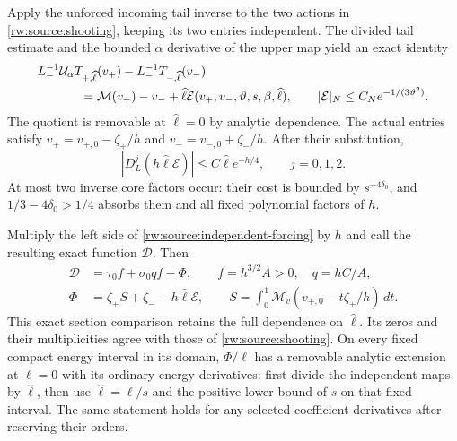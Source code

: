 Apply the unforced incoming tail inverse to the two actions in
\eqref{rw:source:shooting}, keeping its two entries independent.
The divided tail estimate and the bounded $\alpha$ derivative of the
upper map yield an exact identity
\begin{equation}\label{rw:source:independent-forcing}
\begin{split}
 &L_-^{-1}\mathcal U_\alpha T_{+,\widehat\ell}(v_+)
                   -L_-^{-1}T_{-,\widehat\ell}(v_-)\\
 &\hspace{12mm}=\mathcal M(v_+)-v_-
       +\widehat\ell\mathcal E(v_+,v_-,\vartheta,s,\beta,\widehat\ell),
 \qquad |\mathcal E|_N\le C_Ne^{-1/(3\vartheta^2)}.
\end{split}
\end{equation}
The quotient is removable at $\widehat\ell=0$ by analytic dependence.
The actual entries satisfy
$v_+=v_{+,0}-\zeta_+/h$ and
$v_-=v_{-,0}+\zeta_-/h$. After their substitution,
\begin{equation}\label{rw:source:forced-error}
 |D_L^j(h\widehat\ell\mathcal E)|\le C\widehat\ell e^{-h/4},
 \qquad j=0,1,2.
\end{equation}
At most two inverse core factors occur: their cost is bounded by
$s^{-4\delta_0}$, and $1/3-4\delta_0>1/4$ absorbs them and all
fixed polynomial factors of $h$.

Multiply the left side of \eqref{rw:source:independent-forcing}
by $h$ and call the resulting exact function $\mathcal D$. Then
\begin{equation}\label{rw:source:matched}
\begin{split}
 \mathcal D&=\tau_0 f+\sigma_0qf-\Phi,\qquad
 f=h^{3/2}A>0,\quad q=hC/A,\\
 \Phi&=\zeta_+S+\zeta_--h\widehat\ell\mathcal E,\qquad
 S=\int_0^1\mathcal M_v(v_{+,0}-t\zeta_+/h)\,dt.
\end{split}
\end{equation}
This exact section comparison retains the full dependence on
$\widehat\ell$. Its zeros and their multiplicities agree with those
of \eqref{rw:source:shooting}.
On every fixed compact energy interval in its domain, $\Phi/\ell$
has a removable analytic extension at $\ell=0$ with its ordinary
energy derivatives: first divide the independent maps by $\widehat\ell$,
then use $\widehat\ell=\ell/s$ and the positive lower bound of $s$ on
that fixed interval. The same statement holds for any selected
coefficient derivatives after reserving their orders.

